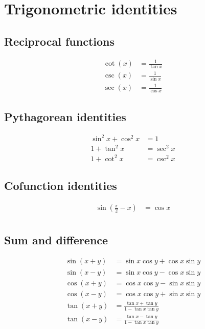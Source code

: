 \section*{Trigonometric identities}

\subsection*{Reciprocal functions}

\begin{align*}
  \cot(x) &= \frac{1}{\tan x}\\
  \csc(x) &= \frac{1}{\sin x}\\
  \sec(x) &= \frac{1}{\cos x}
\end{align*}

\subsection*{Pythagorean identities}

\begin{align*}
  \sin^2 x + \cos^2 x &= 1\\
  1 + \tan^2 x &= \sec^2 x\\
  1 + \cot^2 x &= \csc^2 x
\end{align*}

\subsection*{Cofunction identities}

\begin{align*}
  \sin(\frac{\pi}{2} - x) &= \cos x\\
\end{align*}


\subsection*{Sum and difference}

\begin{align*}
  \sin(x + y) &= \sin x \cos y + \cos x \sin y\\
  \sin(x - y) &= \sin x \cos y - \cos x \sin y\\
  \cos(x + y) &= \cos x \cos y - \sin x \sin y\\
  \cos(x - y) &= \cos x \cos y + \sin x \sin y\\
  \tan(x + y) &= \frac{\tan x + \tan y}{1 - \tan x \tan y}\\
  \tan(x - y) &= \frac{\tan x - \tan y}{1 - \tan x \tan y}
\end{align*}

